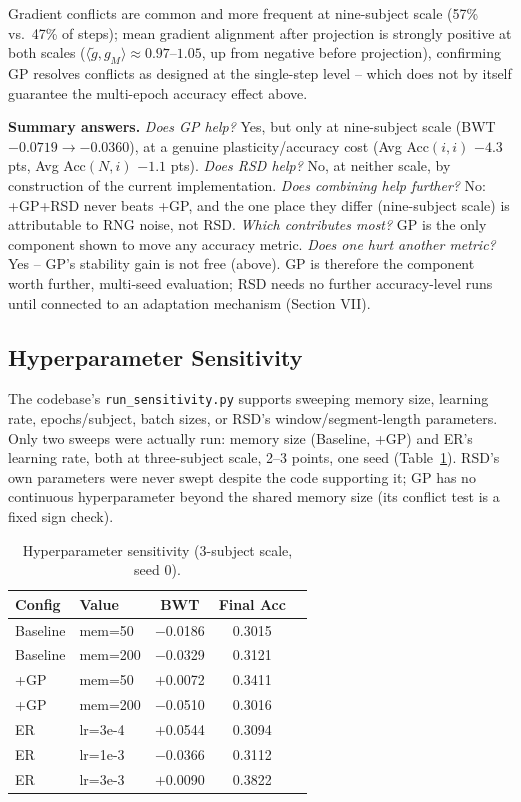 \documentclass[conference]{IEEEtran}
\begin{document}
Gradient conflicts are common and more frequent at nine-subject scale (57\% vs.\ 47\% of steps); mean gradient alignment after projection is strongly positive at both scales ($\langle\tilde g,g_M\rangle\approx0.97$--$1.05$, up from negative before projection), confirming GP resolves conflicts as designed at the single-step level -- which does not by itself guarantee the multi-epoch accuracy effect above.

\textbf{Summary answers.} \emph{Does GP help?} Yes, but only at nine-subject scale (BWT $-0.0719\to-0.0360$), at a genuine plasticity/accuracy cost (Avg Acc$(i,i)$ $-4.3$ pts, Avg Acc$(N,i)$ $-1.1$ pts). \emph{Does RSD help?} No, at neither scale, by construction of the current implementation. \emph{Does combining help further?} No: +GP+RSD never beats +GP, and the one place they differ (nine-subject scale) is attributable to RNG noise, not RSD. \emph{Which contributes most?} GP is the only component shown to move any accuracy metric. \emph{Does one hurt another metric?} Yes -- GP's stability gain is not free (above). GP is therefore the component worth further, multi-seed evaluation; RSD needs no further accuracy-level runs until connected to an adaptation mechanism (Section VII).

\subsection{Hyperparameter Sensitivity}
\label{sec:sensitivity}

The codebase's \texttt{run\_sensitivity.py} supports sweeping memory size, learning rate, epochs/subject, batch sizes, or RSD's window/segment-length parameters. Only two sweeps were actually run: memory size (Baseline, +GP) and ER's learning rate, both at three-subject scale, 2--3 points, one seed (Table~\ref{tab:sens}). RSD's own parameters were never swept despite the code supporting it; GP has no continuous hyperparameter beyond the shared memory size (its conflict test is a fixed sign check).

\begin{table}[t]
\caption{Hyperparameter sensitivity (3-subject scale, seed 0).}
\label{tab:sens}
\centering
\small
\begin{tabular}{@{}llccc@{}}
\toprule
Config & Value & BWT & Final Acc \\
\midrule
Baseline & mem=50 & $-$0.0186 & 0.3015 \\
Baseline & mem=200 & $-$0.0329 & 0.3121 \\
+GP & mem=50 & $+$0.0072 & 0.3411 \\
+GP & mem=200 & $-$0.0510 & 0.3016 \\
ER & lr=3e-4 & $+$0.0544 & 0.3094 \\
ER & lr=1e-3 & $-$0.0366 & 0.3112 \\
ER & lr=3e-3 & $+$0.0090 & 0.3822 \\
\bottomrule
\end{tabular}
\end{table}
\end{document}
